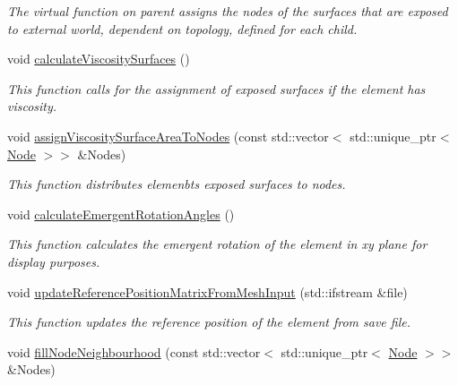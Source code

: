\begin{DoxyCompactItemize}
\begin{DoxyCompactList}\small\item\em The virtual function on parent assigns the nodes of the surfaces that are exposed to external world, dependent on topology, defined for each child. \end{DoxyCompactList}\item 
\hypertarget{classShapeBase_a384ff1314700f9c7157e702c277d2819}{}void \hyperlink{classShapeBase_a384ff1314700f9c7157e702c277d2819}{calculate\+Viscosity\+Surfaces} ()\label{classShapeBase_a384ff1314700f9c7157e702c277d2819}

\begin{DoxyCompactList}\small\item\em This function calls for the assignment of exposed surfaces if the element has viscosity. \end{DoxyCompactList}\item 
\hypertarget{classShapeBase_aa91f3d3cddf8cc01ce06562185c291ba}{}void \hyperlink{classShapeBase_aa91f3d3cddf8cc01ce06562185c291ba}{assign\+Viscosity\+Surface\+Area\+To\+Nodes} (const std\+::vector$<$ std\+::unique\+\_\+ptr$<$ \hyperlink{classNode}{Node} $>$$>$ \&Nodes)\label{classShapeBase_aa91f3d3cddf8cc01ce06562185c291ba}

\begin{DoxyCompactList}\small\item\em This function distributes elemenbt\textquotesingle{}s exposed surfaces to nodes. \end{DoxyCompactList}\item 
\hypertarget{classShapeBase_af616bee3616ec9d1f99628745f330ad7}{}void \hyperlink{classShapeBase_af616bee3616ec9d1f99628745f330ad7}{calculate\+Emergent\+Rotation\+Angles} ()\label{classShapeBase_af616bee3616ec9d1f99628745f330ad7}

\begin{DoxyCompactList}\small\item\em This function calculates the emergent rotation of the element in xy plane for display purposes. \end{DoxyCompactList}\item 
\hypertarget{classShapeBase_a2e339624fd36c39f22a0ef8a40b56329}{}void \hyperlink{classShapeBase_a2e339624fd36c39f22a0ef8a40b56329}{update\+Reference\+Position\+Matrix\+From\+Mesh\+Input} (std\+::ifstream \&file)\label{classShapeBase_a2e339624fd36c39f22a0ef8a40b56329}

\begin{DoxyCompactList}\small\item\em This function updates the reference position of the element from save file. \end{DoxyCompactList}\item 
\hypertarget{classShapeBase_aea16f414d8c6318719badfef575a090d}{}void \hyperlink{classShapeBase_aea16f414d8c6318719badfef575a090d}{fill\+Node\+Neighbourhood} (const std\+::vector$<$ std\+::unique\+\_\+ptr$<$ \hyperlink{classNode}{Node} $>$$>$ \&Nodes)\label{classShapeBase_aea16f414d8c6318719badfef575a090d}


\end{DoxyCompactItemize}
